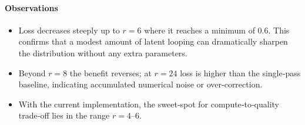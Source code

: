 

\paragraph{Observations}

\begin{itemize}
    \item Loss decreases steeply up to \(r=6\) where it reaches a minimum
          of 0.6.  This confirms that a modest amount of latent looping
          can dramatically sharpen the distribution without any extra
          parameters.
    \item Beyond \(r=8\) the benefit reverses; at \(r=24\) loss is higher
          than the single‑pass baseline, indicating accumulated numerical
          noise or over‑correction.
    \item With the current implementation, the sweet‑spot
          for compute‑to‑quality trade‑off lies in the range
          \(r=4\)–\(6\).
\end{itemize}
